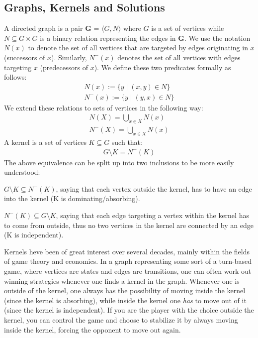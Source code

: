 \subsection{Graphs, Kernels and Solutions}
\label{sub:Graphs, Kernels and Solution}
A directed graph is a pair \textbf{G} = $\langle G,N \rangle$ where $G$ is a set of vertices while $N \subseteq G \times G$ is a binary relation representing the edges in \textbf{G}.
We use the notation $N(x)$ to denote the set of all vertices that are targeted by edges originating in $x$ (successors of $x$).
Similarly, $N^-(x)$ denotes the set of all vertices with edges targeting $x$ (predecessors of $x$).
We define these two predicates formally as follows:
\begin{align}
  N(x) := \{y \;|\; (x,y) \in N\}\\
  N^-(x) := \{ y \;|\; (y,x) \in N \}
\end{align}
We extend these relations to sets of vertices in the following way:
\begin{align}
  N(X) = \bigcup_{x \in X} N(x)\\
  N^-(X) = \bigcup_{x \in X} N(x)
\end{align}
A kernel is a set of vertices $K \subseteq G$ such that:
\begin{align}
  G \setminus K = N^-(K)
\end{align}
The above equivalence can be split up into two inclusions to be more easily understood:

$G \setminus K \subseteq N^-(K)$, saying that each vertex outside the kernel, has to have an edge into the kernel (K is dominating/absorbing).

$N^-(K) \subseteq G \setminus K$, saying that each edge targeting a vertex within the kernel has to come from outside, thus no two vertices in the kernel are connected by an edge (K is independent).

Kernels heve been of great interest over several decades, mainly within the fields of game theory and economics\cite{neumann}.
In a graph representing some sort of a turn-based game, where vertices are states and edges are transitions, one can often work out winning strategies whenever one finds a kernel in the graph.
Whenever one is outside of the kernel, one always has the possibility of moving inside the kernel (since the kernel is absorbing), while inside the kernel one \textit{has} to move out of it (since the kernel is independent).
If you are the player with the choice outside the kernel, you can control the game and choose to stabilize it by always moving inside the kernel, forcing the opponent to move out again.


